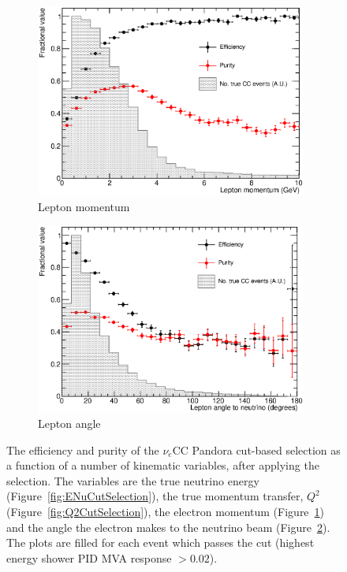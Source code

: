 \begin{figure}
\begin{subfigure}[t]{0.48\linewidth}
    \includegraphics[width=0.98\textwidth]{LeptonMomentumCutSelection.eps}
    \caption{Lepton momentum}
    \label{fig:LeptonMomentumCutSelection}
  \end{subfigure}
  \hfill
  \begin{subfigure}[t]{0.48\linewidth}
    \centering
    \includegraphics[width=0.98\textwidth]{LeptonAngleCutSelection.eps}
    \caption{Lepton angle}
    \label{fig:LeptonAngleCutSelection}
  \end{subfigure}
  \caption[The efficiency and purity of the $\nu_e$CC Pandora cut-based selection as a function of a number of kinematic variables, after applying the selection.]{The efficiency and purity of the $\nu_e$CC Pandora cut-based selection as a function of a number of kinematic variables, after applying the selection.  The variables are the true neutrino energy (Figure~\ref{fig:ENuCutSelection}), the true momentum transfer, $Q^2$ (Figure~\ref{fig:Q2CutSelection}), the electron momentum (Figure~\ref{fig:LeptonMomentumCutSelection}) and the angle the electron makes to the neutrino beam (Figure~\ref{fig:LeptonAngleCutSelection}).  The plots are filled for each event which passes the cut (highest energy shower PID MVA response $>0.02$).}
  \label{fig:EffPurCutSelection}
\end{figure}

